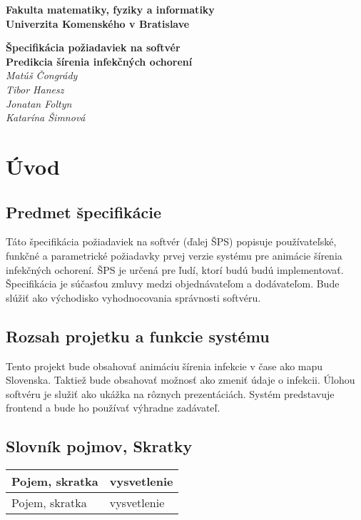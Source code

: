 \documentclass[12pt,a4paper]{report}
\begin{document}
\begin{titlepage}
\centering\bfseries
		Fakulta matematiky, fyziky a informatiky\\Univerzita Komenského v Bratislave	

	\fontsize{23}{28}\textbf{Špecifikácia požiadaviek na softvér}\\
	\fontsize{16}{22}\textbf{Predikcia šírenia infekčných ochorení}\\
	\large\textit{Matúš Čongrády\\Tibor Hanesz\\Jonatan Foltyn\\Katarína Šimnová}

\end{titlepage}\bigskip
	\setcounter{tocdepth}{9}
	\tableofcontents
	
\renewcommand{\chaptername}{}	
	\chapter[Úvod]{\rmfamily\bfseries
Úvod}


\section[Predmet špecifikácie]{\rmfamily\bfseries
	Predmet špecifikácie}
Táto špecifikácia požiadaviek na softvér (ďalej ŠPS) popisuje používateľské, funkčné a parametrické požiadavky prvej verzie systému pre animácie šírenia infekčných ochorení. ŠPS je určená pre ľudí, ktorí budú budú implementovať. Špecifikácia je súčasťou zmluvy medzi objednávateľom a dodávateľom. Bude slúžiť ako východisko vyhodnocovania správnosti softvéru.

\section[Rozsah projetku a funkcie systému]{\rmfamily\bfseries
Rozsah projetku a funkcie systému}	
Tento projekt bude obsahovať animáciu šírenia infekcie v čase ako mapu Slovenska. Taktiež bude obsahovať možnosť ako zmeniť údaje o infekcii. Úlohou softvéru je služiť ako ukážka na rôznych prezentáciách. Systém predstavuje frontend a bude ho používať výhradne zadávateľ. 

\section[Slovník pojmov, Skratky]{\rmfamily\bfseries
	Slovník pojmov, Skratky}	
\begin{table}[h!]
	\centering
	\begin{tabular}{|>{\centering\arraybackslash}m{1in}|>{\centering\arraybackslash}m{1in}|}
		\hline
		\centering Pojem, skratka & vysvetlenie \\ [0ex]
		\hline
		Pojem, skratka & vysvetlenie \\ [0ex]
		\hline
	\end{tabular}
\end{table}
\end{document}

